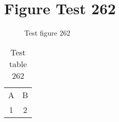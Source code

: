 \documentclass{article}
\begin{document}
\section{Figure Test 262}
\begin{figure}[h]
\caption{Test figure 262}
\end{figure}
\begin{table}[h]
\caption{Test table 262}
\begin{tabular}{cc}
A & B \\
1 & 2
\end{tabular}
\end{table}
\end{document}
